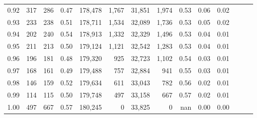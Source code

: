 \begin{tabular}{rrrrrrrrrrrrrr}
0.92 &    317 &  286 &  0.47 &  178,478 &    1,767 &  31,851 &   1,974 &  0.53 &  0.06 &      0.02 \\
0.93 &    233 &  238 &  0.51 &  178,711 &    1,534 &  32,089 &   1,736 &  0.53 &  0.05 &      0.02 \\
0.94 &    202 &  240 &  0.54 &  178,913 &    1,332 &  32,329 &   1,496 &  0.53 &  0.04 &      0.01 \\
0.95 &    211 &  213 &  0.50 &  179,124 &    1,121 &  32,542 &   1,283 &  0.53 &  0.04 &      0.01 \\
0.96 &    196 &  181 &  0.48 &  179,320 &      925 &  32,723 &   1,102 &  0.54 &  0.03 &      0.01 \\
0.97 &    168 &  161 &  0.49 &  179,488 &      757 &  32,884 &     941 &  0.55 &  0.03 &      0.01 \\
0.98 &    146 &  159 &  0.52 &  179,634 &      611 &  33,043 &     782 &  0.56 &  0.02 &      0.01 \\
0.99 &    114 &  115 &  0.50 &  179,748 &      497 &  33,158 &     667 &  0.57 &  0.02 &      0.01 \\
1.00 &    497 &  667 &  0.57 &  180,245 &        0 &  33,825 &       0 &   nan &  0.00 &      0.00 \\
\bottomrule
\end{tabular}
